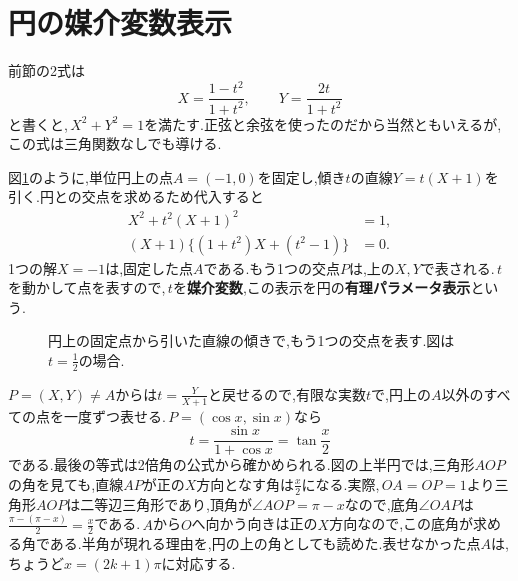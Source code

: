 \section{円の媒介変数表示}\label{節:円の有理パラメータ}

前節の2式は
\[
X=\frac{1-t^2}{1+t^2},\qquad
Y=\frac{2t}{1+t^2}
\]
と書くと,\,$X^2+Y^2=1$を満たす.正弦と余弦を使ったのだから当然ともいえるが,この式は三角関数なしでも導ける.

図\ref{図:円の有理パラメータ}のように,単位円上の点$A=(-1,0)$を固定し,傾き$t$の直線$Y=t(X+1)$を引く.円との交点を求めるため代入すると
\[
\begin{aligned}
X^2+t^2(X+1)^2&=1,\\
(X+1)\{(1+t^2)X+(t^2-1)\}&=0.
\end{aligned}
\]
1つの解$X=-1$は,固定した点$A$である.もう1つの交点$P$は,上の$X,Y$で表される.\,$t$を動かして点を表すので,\,$t$を\textbf{媒介変数},この表示を円の\textbf{有理パラメータ表示}という.

\begin{figure}[htbp]
\centering
{}
\caption{円上の固定点から引いた直線の傾きで,もう1つの交点を表す.図は$t=\frac12$の場合.}
\label{図:円の有理パラメータ}
\end{figure}

$P=(X,Y)\ne A$からは$t=\frac{Y}{X+1}$と戻せるので,有限な実数$t$で,円上の$A$以外のすべての点を一度ずつ表せる.\,$P=(\cos x,\sin x)$なら
\[
t=\frac{\sin x}{1+\cos x}=\tan\frac x2
\]
である.最後の等式は2倍角の公式から確かめられる.図の上半円では,三角形$AOP$の角を見ても,直線$AP$が正の$X$方向となす角は$\frac x2$になる.実際,\,$OA=OP=1$より三角形$AOP$は二等辺三角形であり,頂角が$\angle AOP=\pi-x$なので,底角$\angle OAP$は$\frac{\pi-(\pi-x)}{2}=\frac x2$である.\,$A$から$O$へ向かう向きは正の$X$方向なので,この底角が求める角である.半角が現れる理由を,円の上の角としても読めた.表せなかった点$A$は,ちょうど$x=(2k+1)\pi$に対応する.

%
